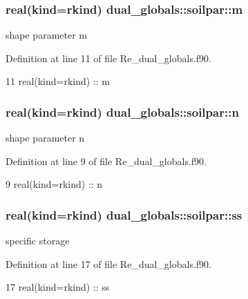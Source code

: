 \subsubsection[{m}]{\setlength{\rightskip}{0pt plus 5cm}real(kind=rkind) dual\+\_\+globals\+::soilpar\+::m}\label{structdual__globals_1_1soilpar_a9b32754cd311ca231833b02b5edc7fc9}


shape parameter m 



Definition at line 11 of file Re\+\_\+dual\+\_\+globals.\+f90.


\begin{DoxyCode}
11     \textcolor{keywordtype}{real(kind=rkind)} :: m
\end{DoxyCode}
\subsubsection[{n}]{\setlength{\rightskip}{0pt plus 5cm}real(kind=rkind) dual\+\_\+globals\+::soilpar\+::n}\label{structdual__globals_1_1soilpar_a5f3b332d71dee9fa4576a3abc48ba5c2}


shape parameter n 



Definition at line 9 of file Re\+\_\+dual\+\_\+globals.\+f90.


\begin{DoxyCode}
9     \textcolor{keywordtype}{real(kind=rkind)} :: n
\end{DoxyCode}
\subsubsection[{ss}]{\setlength{\rightskip}{0pt plus 5cm}real(kind=rkind) dual\+\_\+globals\+::soilpar\+::ss}\label{structdual__globals_1_1soilpar_af6c075b429d7a26e8808a6549a37ee41}


specific storage 



Definition at line 17 of file Re\+\_\+dual\+\_\+globals.\+f90.


\begin{DoxyCode}
17     \textcolor{keywordtype}{real(kind=rkind)} :: ss
\end{DoxyCode}
